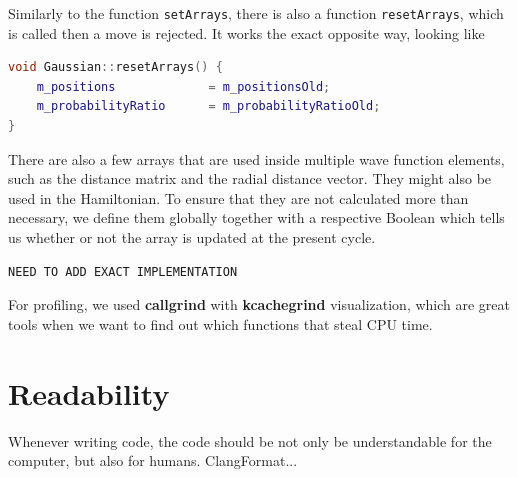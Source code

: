 Similarly to the function \texttt{setArrays}, there is also a function \texttt{resetArrays}, which is called then a move is rejected. It works the exact opposite way, looking like

\lstset{basicstyle=\scriptsize}
\begin{lstlisting}[language=c++,caption={from \texttt{gaussian.cpp}}]
void Gaussian::resetArrays() {
    m_positions             = m_positionsOld;
    m_probabilityRatio      = m_probabilityRatioOld;
}
\end{lstlisting}

There are also a few arrays that are used inside multiple wave function elements, such as the distance matrix and the radial distance vector. They might also be used in the Hamiltonian. To ensure that they are not calculated more than necessary, we define them globally together with a respective Boolean which tells us whether or not the array is updated at the present cycle. 

\lstset{basicstyle=\scriptsize}
\begin{lstlisting}[language=c++,caption={from \texttt{system.cpp}}]
NEED TO ADD EXACT IMPLEMENTATION
\end{lstlisting}

For profiling, we used \textbf{callgrind} with \textbf{kcachegrind} visualization, which are great tools when we want to find out which functions that steal CPU time.

\section{Readability}
Whenever writing code, the code should be not only be understandable for the computer, but also for humans. ClangFormat... 

